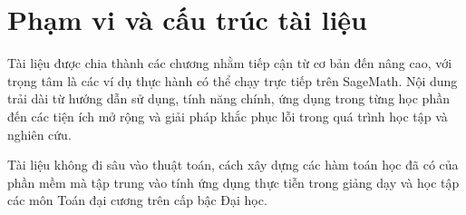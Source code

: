 \section{Phạm vi và cấu trúc tài liệu}

Tài liệu được chia thành các chương nhằm tiếp cận từ cơ bản đến nâng cao, với trọng tâm là các ví dụ thực hành có thể chạy trực tiếp trên SageMath. Nội dung trải dài từ hướng dẫn sử dụng, tính năng chính, ứng dụng trong từng học phần đến các tiện ích mở rộng và giải pháp khắc phục lỗi trong quá trình học tập và nghiên cứu.

Tài liệu không đi sâu vào thuật toán, cách xây dựng các hàm toán học đã có của phần mềm mà tập trung vào tính ứng dụng thực tiễn trong giảng dạy và học tập các môn Toán đại cương trên cấp bậc Đại học.
